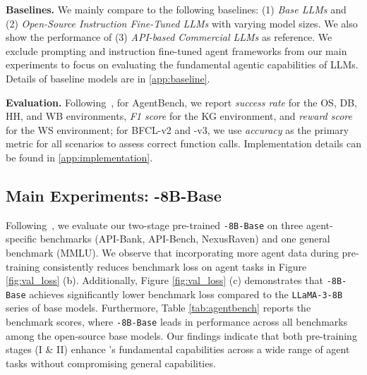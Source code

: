 \noindent \textbf{Baselines.}
We mainly compare to the following baselines: (1) \emph{Base LLMs} and 
(2) \emph{Open-Source Instruction Fine-Tuned LLMs} with varying model sizes. 
We also show the performance of (3) \emph{API-based Commercial LLMs} as reference. 
We exclude prompting and instruction fine-tuned agent frameworks from our main experiments to focus on evaluating the fundamental agentic capabilities of LLMs.
Details of baseline models are in \cref{app:baseline}.

\noindent \textbf{Evaluation.}
Following~\citet{liu2024agentbench,patil2023gorilla},
for AgentBench, we report \emph{success rate} for the OS, DB, HH, and WB environments, \emph{F1 score} for the KG environment, and \emph{reward score} for the WS environment; for BFCL-v2 and -v3, we use \emph{accuracy} as the primary metric for all scenarios to assess correct function calls.
Implementation details can be found in \cref{app:implementation}.



\subsection{Main Experiments: \method-8B-Base}
Following~\citet{shao2024deepseekmath,dubey2024llama}, we evaluate our two-stage pre-trained \texttt{\method-8B-Base} on three agent-specific benchmarks (API-Bank, API-Bench, NexusRaven) and one general benchmark (MMLU).
We observe that incorporating more agent data during pre-training consistently reduces benchmark loss on agent tasks in Figure \ref{fig:val_loss} (b). Additionally, Figure \ref{fig:val_loss} (c) demonstrates that \texttt{\method-8B-Base} achieves significantly lower benchmark loss compared to the \texttt{LLaMA-3-8B} series of base models.
Furthermore, Table \ref{tab:agentbench} reports the benchmark scores, where \texttt{\method-8B-Base} leads in performance across all benchmarks among the open-source base models. 
Our findings indicate that both pre-training stages (I \& II) enhance \method's fundamental capabilities across a wide range of agent tasks without compromising general capabilities.

